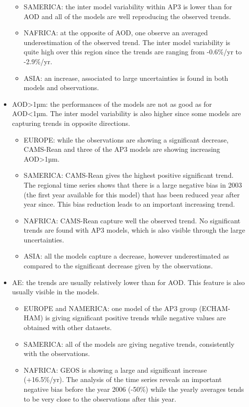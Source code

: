\documentclass[journal abbreviation, manuscript]{copernicus}
\begin{document}
\begin{itemize}
\begin{itemize}
        \item SAMERICA: the inter model variability within AP3 is lower than for AOD and all of the models are well reproducing the observed trends.
        \item NAFRICA: at the opposite of AOD, one observe an averaged underestimation of the observed trend. The inter model variability is quite high over this region since the trends are ranging from -0.6\%/yr to -2.9\%/yr.
        \item ASIA: an increase, associated to large uncertainties is found in both models and observations.
       \end{itemize}
 \item AOD>1µm: the performances of the models are not as good as for AOD<1µm. The inter model variability is also higher since some models are capturing trends in opposite directions.
       \begin{itemize}
        \item EUROPE: while the observations are showing a significant decrease, CAMS-Rean and three of the AP3 models are showing increasing AOD>1µm.
        \item SAMERICA: CAMS-Rean gives the highest positive significant trend. The regional time series shows that there is a large negative bias in 2003 (the first year available for this model) that has been reduced year after year since. This bias reduction leads to an important increasing trend.
        \item NAFRICA: CAMS-Rean capture well the observed trend. No significant trends are found with AP3 models, which is also visible through the large uncertainties.
        \item ASIA: all the models capture a decrease, however underestimated as compared to the significant decrease given by the observations.
       \end{itemize}
 \item AE: the trends are usually relatively lower than for AOD. This feature is also usually visible in the models.
       \begin{itemize}
        \item EUROPE and NAMERICA: one model of the AP3 group (ECHAM-HAM) is giving significant positive trends while negative values are obtained with other datasets.
        \item SAMERICA: all of the models are giving negative trends, consistently with the observations.
        \item NAFRICA: GEOS is showing a large and significant increase (+16.5\%/yr). The analysis of the time series reveals an important negative bias before the year 2006 (-50\%) while the yearly averages tends to be very close to the observations after this year.

\end{itemize}
\end{itemize}
\end{document}
